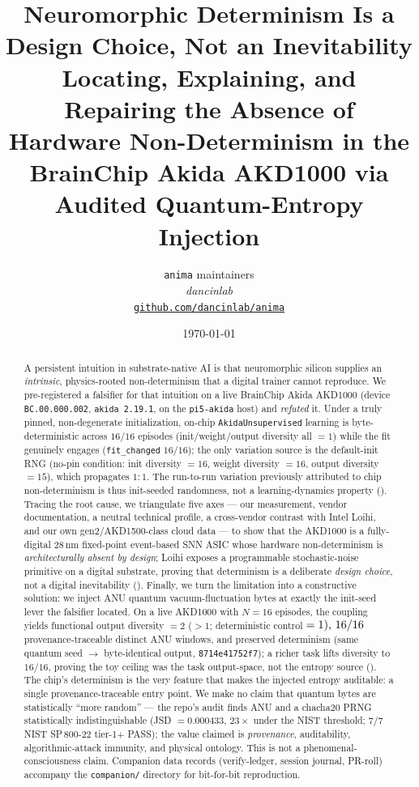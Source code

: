 \documentclass[11pt,a4paper]{article}
\title{
  \textbf{Neuromorphic Determinism Is a Design Choice, Not an Inevitability}\\[4pt]
  \large Locating, Explaining, and Repairing the Absence of Hardware
  Non-Determinism in the BrainChip Akida AKD1000 via Audited
  Quantum-Entropy Injection
}
\author{
  \texttt{anima} maintainers\\
  \normalsize\textit{dancinlab}\\[2pt]
  \normalsize\href{https://github.com/dancinlab/anima}{\texttt{github.com/dancinlab/anima}}
}
\date{\today}
\providecommand{\tierGreen}{🟢}
\providecommand{\tierRed}{🔴}
\renewcommand{\tierGreen}{{\color{green!55!black}\textbullet}}
\renewcommand{\tierRed}{{\color{red!75!black}\textbullet}}
\begin{document}
\maketitle

\begin{abstract}
A persistent intuition in substrate-native AI is that neuromorphic
silicon supplies an \emph{intrinsic}, physics-rooted non-determinism that
a digital trainer cannot reproduce. We pre-registered a falsifier for that
intuition on a live BrainChip Akida AKD1000 (device \texttt{BC.00.000.002},
\texttt{akida 2.19.1}, on the \texttt{pi5-akida} host) and \emph{refuted}
it. Under a truly pinned, non-degenerate initialization, on-chip
\texttt{AkidaUnsupervised} learning is byte-deterministic across
\(16/16\) episodes (init/weight/output diversity all \(=1\)) while the fit
genuinely engages (\texttt{fit\_changed} \(16/16\)); the only variation
source is the default-init RNG (no-pin condition: init diversity \(=16\),
weight diversity \(=16\), output diversity \(=15\)), which propagates
\(1{:}1\). The run-to-run variation previously attributed to chip
non-determinism is thus init-seeded randomness, not a learning-dynamics
property (\tierRed). Tracing the root cause, we triangulate five axes ---
our measurement, vendor documentation, a neutral technical profile, a
cross-vendor contrast with Intel Loihi, and our own gen2/AKD1500-class
cloud data --- to show that the AKD1000 is a fully-digital 28\,nm
fixed-point event-based SNN ASIC whose hardware non-determinism is
\emph{architecturally absent by design}; Loihi exposes a programmable
stochastic-noise primitive on a digital substrate, proving that determinism
is a deliberate \emph{design choice}, not a digital inevitability
(\tierGreen). Finally, we turn the limitation into a constructive solution:
we inject ANU quantum vacuum-fluctuation bytes at exactly the init-seed
lever the falsifier located. On a live AKD1000 with \(N=16\) episodes, the
coupling yields functional output diversity \(=2\) ($>1$; deterministic
control \(=1$), \(16/16\) provenance-traceable distinct ANU windows, and
preserved determinism (same quantum seed \(\rightarrow\) byte-identical
output, \texttt{8714e41752f7}); a richer task lifts diversity to
\(16/16\), proving the toy ceiling was the task output-space, not the
entropy source (\tierGreen). The chip's determinism is the very feature
that makes the injected entropy auditable: a single provenance-traceable
entry point. We make no claim that quantum bytes are statistically
``more random'' --- the repo's audit finds ANU and a chacha20 PRNG
statistically indistinguishable (JSD \(=0.000433\), \(23\times\) under the
NIST threshold; \(7/7\) NIST SP\,800-22 tier-1+ PASS); the value claimed is
\emph{provenance}, auditability, algorithmic-attack immunity, and physical
ontology. This is not a phenomenal-consciousness claim. Companion data
records (verify-ledger, session journal, PR-roll) accompany the
\texttt{companion/} directory for bit-for-bit reproduction.
\end{abstract}
\end{document}
